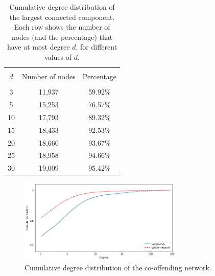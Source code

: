 \documentclass[11pt, english]{article}
\begin{document}
\begin{multicols}{2}
\begin{table}
	\caption{Cumulative degree distribution of the largest connected component. Each row shows the number of nodes (and the percentage) that have at most degree $d$, for different values of $d$.}
	\label{tab:cumulative-degree-distribution-CC}
	\centering
	\begin{tabular}{ccc}
		\hline\hline
		\\[-1.5ex]
		$d$		&	Number of nodes	&	Percentage	\\[0.5ex]\hline
		\\[-1.5ex]
		3		&	11,937			&	59.92\%		\\[0.2ex]
		5		&	15,253			&	76.57\%		\\[0.2ex]
		10		&	17,793			&	89.32\%		\\[0.2ex]
		15		&	18,433			&	92.53\%		\\[0.2ex]
		20		&	18,660			&	93.67\%		\\[0.2ex]
		25		&	18,958			&	94.66\%		\\[0.2ex]
		30		&	19,009			&	95.42\%		\\[0.5ex]
		\hline\hline
	\end{tabular}
\end{table}

\begin{figure}
	\caption{Cumulative degree distribution of the co-offending network.}
	\centering
	\label{fig:cumulative-degree-distribution-CC}
	\includegraphics[width=0.7\textwidth]{cumulative-degree-distribution-CC}
\end{figure}

\end{multicols}
\end{document}
